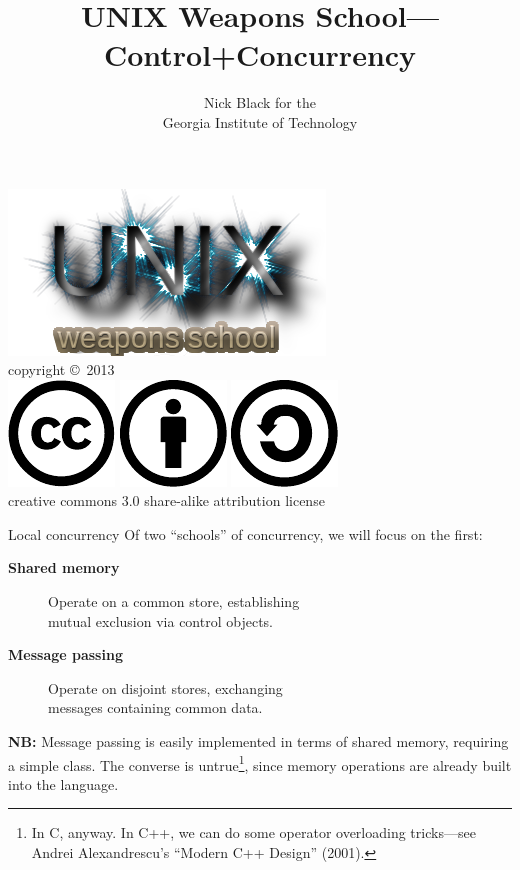 \documentclass[mathserif,xcolor={dvipsnames,table}]{beamer}
\title{UNIX Weapons School---Control+Concurrency}
\date{}
\author{Nick Black for the\\
Georgia Institute of Technology
}
\begin{document}
\begin{frame}
\titlepage
\begin{center}
\includegraphics[scale=0.33]{images/uws.png}\\
\vspace{.1in}
\tiny{copyright \copyright\ 2013}\\
\includegraphics[scale=.25]{images/cc-logo.pdf}
\includegraphics[scale=.25]{images/cc-new.pdf}
\includegraphics[scale=.25]{images/cc-share.pdf}\\
\tiny{creative commons 3.0 share-alike attribution license}
\end{center}
\end{frame}

\begin{frame}{Local concurrency}
Of two ``schools'' of concurrency, we will focus on the first:
\vfill
\begin{description}
\item[\textbf{Shared memory}]\hfill{Operate on a common store, establishing\\ \hfill mutual exclusion via control objects.}
\item[\textbf{Message passing}]\hfill{Operate on disjoint stores, exchanging\\ \hfill messages containing common data.}
\end{description}
\vfill
\textbf{NB:} Message passing is easily implemented
in terms of shared memory, requiring a simple class. The converse is untrue\footnote{In C, anyway.
In C++, we can do some operator overloading tricks---see Andrei Alexandrescu's ``Modern C++ Design'' (2001).}, since
memory operations are already built into the language.
\end{frame}
\end{document}
